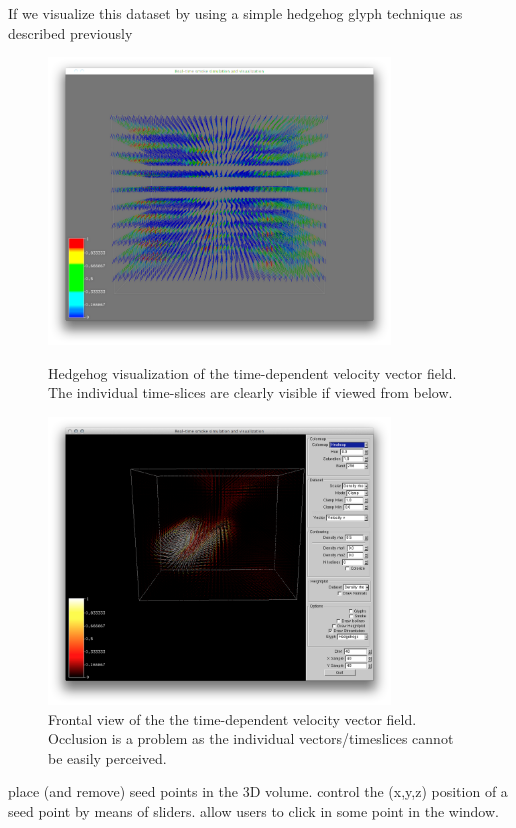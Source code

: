 If we visualize this dataset by using a simple hedgehog glyph technique as described previously 
 \begin{figure}[htbp]
 \centering
 \begin{minipage}[t]{0.48\textwidth}
 \includegraphics[height=3in]{figures/streamtubes/30datacube_bottom.png}
 \caption{Hedgehog visualization of the time-dependent velocity vector field. The individual time-slices are clearly visible if viewed from below.}
 \label{fig:datacube_bottom}
 \end{minipage}\hspace{.04\textwidth}%
 \begin{minipage}[t]{0.48\textwidth}
 \includegraphics[height=3in]{figures/streamtubes/31datacube_front.png}
 \caption{Frontal view of the the time-dependent velocity vector field. Occlusion is a problem as the individual vectors/timeslices cannot be easily perceived.}
 \label{fig:}
 \end{minipage}
 \end{figure}
 
 
 place (and remove) seed points in the 3D volume.
 control the (x,y,z) position of a seed point by means of sliders. 
 allow users to click in some point in the window. 
 
